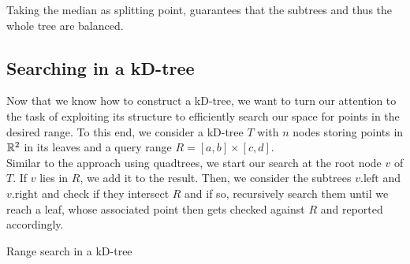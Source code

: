     \begin{remark}
        Taking the median as splitting point, guarantees that the subtrees and thus the whole tree are balanced.
    \end{remark}

    \subsection{Searching in a kD-tree}
        Now that we know how to construct a kD-tree, we want to turn our attention to the task of exploiting its structure to efficiently search our space for points in the desired range. To this end, we consider a kD-tree $T$ with $n$ nodes storing points in $\mathbb{R}^2$ in its leaves and a query range $R = [a, b] \times [c, d]$. \\
        Similar to the approach using quadtrees, we start our search at the root node $v$ of $T$. If $v$ lies in $R$, we add it to the result. Then, we consider the subtrees $v.\text{left}$ and $v.\text{right}$ and check if they intersect $R$ and if so, recursively search them until we reach a leaf, whose associated point then gets checked against $R$ and reported accordingly.

        \begin{breakablealgorithm}
            \caption{Range search in a kD-tree}
            \label{alg:kdtree_rangesearch}
            \begin{algorithmic}[1]
                \EndProcedure
                    \EndIf
                    \EndIf
                    \EndIf
                    \EndIf
                \EndProcedure
            \end{algorithmic}
        \end{breakablealgorithm}

